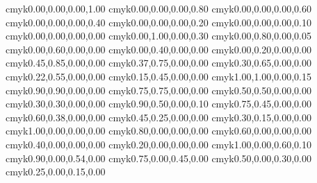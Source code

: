 %
%
%
%

%
%
\definecolor{black}              {cmyk}{0.00,0.00,0.00,1.00}
\definecolor{verydarkgrey}       {cmyk}{0.00,0.00,0.00,0.80}
\definecolor{darkgrey}           {cmyk}{0.00,0.00,0.00,0.60}
\definecolor{grey}               {cmyk}{0.00,0.00,0.00,0.40}
\definecolor{lightgrey}          {cmyk}{0.00,0.00,0.00,0.20}
\definecolor{verylightgrey}      {cmyk}{0.00,0.00,0.00,0.10}
\definecolor{white}              {cmyk}{0.00,0.00,0.00,0.00}
\definecolor{verydarkmagenta}    {cmyk}{0.00,1.00,0.00,0.30}
\definecolor{darkmagenta}        {cmyk}{0.00,0.80,0.00,0.05}
\definecolor{magenta}            {cmyk}{0.00,0.60,0.00,0.00}
\definecolor{lightmagenta}       {cmyk}{0.00,0.40,0.00,0.00}
\definecolor{verylightmagenta}   {cmyk}{0.00,0.20,0.00,0.00}
\definecolor{verydarkviolet}     {cmyk}{0.45,0.85,0.00,0.00}
\definecolor{darkviolet}         {cmyk}{0.37,0.75,0.00,0.00}
\definecolor{violet}             {cmyk}{0.30,0.65,0.00,0.00}
\definecolor{lightviolet}        {cmyk}{0.22,0.55,0.00,0.00}
\definecolor{verylightviolet}    {cmyk}{0.15,0.45,0.00,0.00}
\definecolor{verydarkblue}       {cmyk}{1.00,1.00,0.00,0.15}
\definecolor{darkblue}           {cmyk}{0.90,0.90,0.00,0.00}
\definecolor{blue}               {cmyk}{0.75,0.75,0.00,0.00}
\definecolor{lightblue}          {cmyk}{0.50,0.50,0.00,0.00}
\definecolor{verylightblue}      {cmyk}{0.30,0.30,0.00,0.00}
\definecolor{verydarkskyblue}    {cmyk}{0.90,0.50,0.00,0.10}
\definecolor{darkskyblue}        {cmyk}{0.75,0.45,0.00,0.00}
\definecolor{skyblue}            {cmyk}{0.60,0.38,0.00,0.00}
\definecolor{lightskyblue}       {cmyk}{0.45,0.25,0.00,0.00}
\definecolor{verylightskyblue}   {cmyk}{0.30,0.15,0.00,0.00}
\definecolor{verydarkcyan}       {cmyk}{1.00,0.00,0.00,0.00}
\definecolor{darkcyan}           {cmyk}{0.80,0.00,0.00,0.00}
\definecolor{cyan}               {cmyk}{0.60,0.00,0.00,0.00}
\definecolor{lightcyan}          {cmyk}{0.40,0.00,0.00,0.00}
\definecolor{verylightcyan}      {cmyk}{0.20,0.00,0.00,0.00}
\definecolor{verydarkseagreen}   {cmyk}{1.00,0.00,0.60,0.10}
\definecolor{darkseagreen}       {cmyk}{0.90,0.00,0.54,0.00}
\definecolor{seagreen}           {cmyk}{0.75,0.00,0.45,0.00}
\definecolor{lightseagreen}      {cmyk}{0.50,0.00,0.30,0.00}
\definecolor{verylightseagreen}  {cmyk}{0.25,0.00,0.15,0.00}

